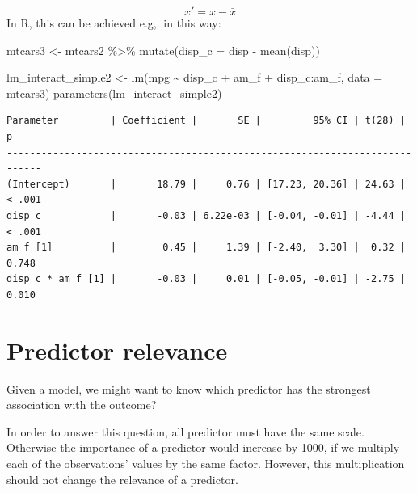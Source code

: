 \documentclass[
  letterpaper,
  DIV=11,
  numbers=noendperiod]{scrreprt}
\newenvironment{Shaded}{\begin{snugshade}}{\end{snugshade}}
\newcommand{\AttributeTok}[1]{\textcolor[rgb]{0.40,0.45,0.13}{#1}}
\newcommand{\FunctionTok}[1]{\textcolor[rgb]{0.28,0.35,0.67}{#1}}
\newcommand{\NormalTok}[1]{\textcolor[rgb]{0.00,0.23,0.31}{#1}}
\newcommand{\OtherTok}[1]{\textcolor[rgb]{0.00,0.23,0.31}{#1}}
\newcommand{\SpecialCharTok}[1]{\textcolor[rgb]{0.37,0.37,0.37}{#1}}
\theoremstyle{definition}
\theoremstyle{definition}
\theoremstyle{remark}
\begin{document}
\[x' = x - \bar{x}\] In R, this can be achieved e.g,. in this way:

\begin{Shaded}
\begin{Highlighting}[]
\NormalTok{mtcars3 }\OtherTok{\textless{}{-}} 
\NormalTok{mtcars2 }\SpecialCharTok{\%\textgreater{}\%} 
  \FunctionTok{mutate}\NormalTok{(}\AttributeTok{disp\_c =}\NormalTok{ disp }\SpecialCharTok{{-}} \FunctionTok{mean}\NormalTok{(disp))}
\end{Highlighting}
\end{Shaded}

\begin{Shaded}
\begin{Highlighting}[]
\NormalTok{lm\_interact\_simple2 }\OtherTok{\textless{}{-}} \FunctionTok{lm}\NormalTok{(mpg }\SpecialCharTok{\textasciitilde{}}\NormalTok{ disp\_c }\SpecialCharTok{+}\NormalTok{ am\_f }\SpecialCharTok{+}\NormalTok{ disp\_c}\SpecialCharTok{:}\NormalTok{am\_f, }\AttributeTok{data =}\NormalTok{ mtcars3)}
\FunctionTok{parameters}\NormalTok{(lm\_interact\_simple2)}
\end{Highlighting}
\end{Shaded}

\begin{verbatim}
Parameter         | Coefficient |       SE |         95% CI | t(28) |      p
----------------------------------------------------------------------------
(Intercept)       |       18.79 |     0.76 | [17.23, 20.36] | 24.63 | < .001
disp c            |       -0.03 | 6.22e-03 | [-0.04, -0.01] | -4.44 | < .001
am f [1]          |        0.45 |     1.39 | [-2.40,  3.30] |  0.32 | 0.748 
disp c * am f [1] |       -0.03 |     0.01 | [-0.05, -0.01] | -2.75 | 0.010 
\end{verbatim}

\hypertarget{predictor-relevance}{%
\section{Predictor relevance}\label{predictor-relevance}}

Given a model, we might want to know which predictor has the strongest
association with the outcome?

In order to answer this question, all predictor must have the same
scale. Otherwise the importance of a predictor would increase by 1000,
if we multiply each of the observations' values by the same factor.
However, this multiplication should not change the relevance of a
predictor.
\end{document}
